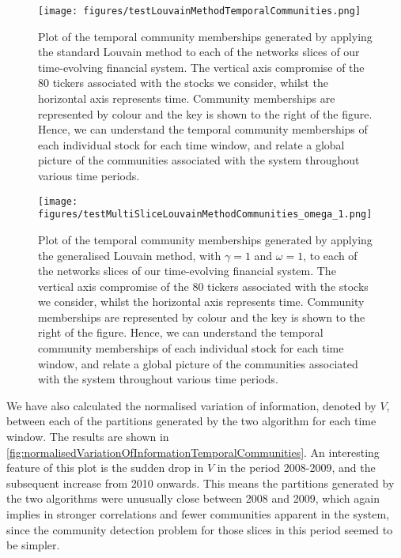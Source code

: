 \begin{figure}
	\centering
	\texttt{[image: figures/testLouvainMethodTemporalCommunities.png]}
	\caption[Plot of the temporal community memberships generated by applying the standard Louvain method to each of the networks slices of our time-evolving financial system.]{\label{fig:standardLouvainMethodTemporalCommunities} Plot of the temporal community memberships generated by applying the standard Louvain method to each of the networks slices of our time-evolving financial system. The vertical axis compromise of the 80 tickers associated with the stocks we consider, whilst the horizontal axis represents time. Community memberships are represented by colour and the key is shown to the right of the figure. Hence, we can understand the temporal community memberships of each individual stock for each time window, and relate a global picture of the communities associated with the system throughout various time periods.}
\end{figure}

\begin{figure}
	\centering
	\texttt{[image: figures/testMultiSliceLouvainMethodCommunities\_omega\_1.png]}
	\caption[Plot of the temporal community memberships generated by applying the generalised Louvain method to each of the networks slices of our time-evolving financial system.]{\label{fig:generalisedLouvainMethodTemporalCommunities} Plot of the temporal community memberships generated by applying the generalised Louvain method, with $\gamma = 1$ and $\omega=1$, to each of the networks slices of our time-evolving financial system. The vertical axis compromise of the 80 tickers associated with the stocks we consider, whilst the horizontal axis represents time. Community memberships are represented by colour and the key is shown to the right of the figure. Hence, we can understand the temporal community memberships of each individual stock for each time window, and relate a global picture of the communities associated with the system throughout various time periods.}
\end{figure}

We have also calculated the normalised variation of information, denoted by $V$, between each of the partitions generated by the two algorithm for each time window.
The results are shown in \cref{fig:normalisedVariationOfInformationTemporalCommunities}.
An interesting feature of this plot is the sudden drop in $V$ in the period 2008-2009, and the subsequent increase from 2010 onwards.
This means the partitions generated by the two algorithms were unusually close between 2008 and 2009, which again implies in stronger correlations and fewer communities apparent in the system, since the community detection problem for those slices in this period seemed to be simpler.

